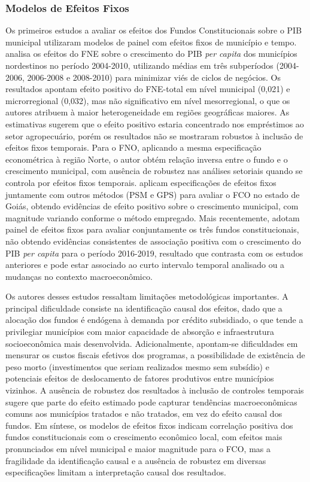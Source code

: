 \subsubsection{Modelos de Efeitos Fixos}

Os primeiros estudos a avaliar os efeitos dos Fundos Constitucionais sobre o PIB municipal utilizaram modelos de painel com efeitos fixos de município e tempo.  analisa os efeitos do FNE sobre o crescimento do PIB \textit{per capita} dos municípios nordestinos no período 2004-2010, utilizando médias em três subperíodos (2004-2006, 2006-2008 e 2008-2010) para minimizar viés de ciclos de negócios. Os resultados apontam efeito positivo do FNE-total em nível municipal (0,021) e microrregional (0,032), mas não significativo em nível mesorregional, o que os autores atribuem à maior heterogeneidade em regiões geográficas maiores. As estimativas sugerem que o efeito positivo estaria concentrado nos empréstimos ao setor agropecuário, porém os resultados não se mostraram robustos à inclusão de efeitos fixos temporais. Para o FNO, aplicando a mesma especificação econométrica à região Norte, o autor obtém relação inversa entre o fundo e o crescimento municipal, com ausência de robustez nas análises setoriais quando se controla por efeitos fixos temporais.  aplicam especificações de efeitos fixos juntamente com outros métodos (PSM e GPS) para avaliar o FCO no estado de Goiás, obtendo evidências de efeito positivo sobre o crescimento municipal, com magnitude variando conforme o método empregado. Mais recentemente,  adotam painel de efeitos fixos para avaliar conjuntamente os três fundos constitucionais, não obtendo evidências consistentes de associação positiva com o crescimento do PIB \textit{per capita} para o período 2016-2019, resultado que contrasta com os estudos anteriores e pode estar associado ao curto intervalo temporal analisado ou a mudanças no contexto macroeconômico.

Os autores desses estudos ressaltam limitações metodológicas importantes. A principal dificuldade consiste na identificação causal dos efeitos, dado que a alocação dos fundos é endógena à demanda por crédito subsidiado, o que tende a privilegiar municípios com maior capacidade de absorção e infraestrutura socioeconômica mais desenvolvida. Adicionalmente, apontam-se dificuldades em mensurar os custos fiscais efetivos dos programas, a possibilidade de existência de peso morto (investimentos que seriam realizados mesmo sem subsídio) e potenciais efeitos de deslocamento de fatores produtivos entre municípios vizinhos. A ausência de robustez dos resultados à inclusão de controles temporais sugere que parte do efeito estimado pode capturar tendências macroeconômicas comuns aos municípios tratados e não tratados, em vez do efeito causal dos fundos. Em síntese, os modelos de efeitos fixos indicam correlação positiva dos fundos constitucionais com o crescimento econômico local, com efeitos mais pronunciados em nível municipal e maior magnitude para o FCO, mas a fragilidade da identificação causal e a ausência de robustez em diversas especificações limitam a interpretação causal dos resultados.

